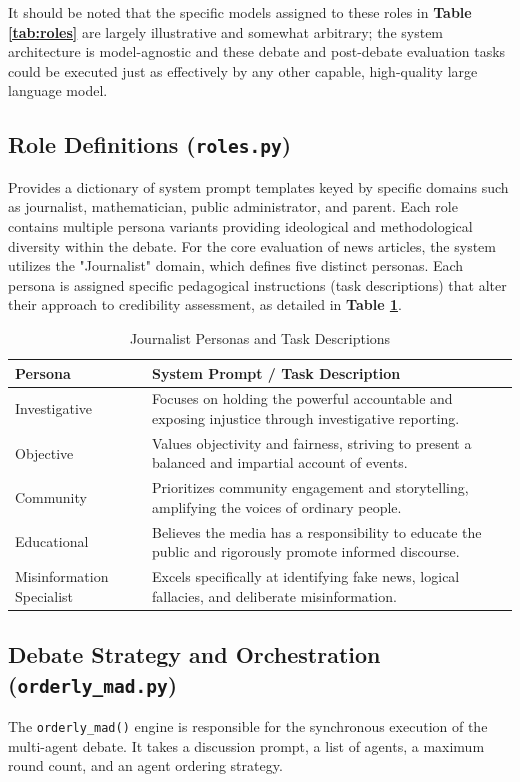 \documentclass[sigconf,nonacm]{acmart}
\begin{document}
It should be noted that the specific models assigned to these roles in \textbf{Table \ref{tab:roles}} are largely illustrative and somewhat arbitrary; the system architecture is model-agnostic and these debate and post-debate evaluation tasks could be executed just as effectively by any other capable, high-quality large language model.

\subsection{Role Definitions (\texttt{roles.py})}\label{sec:roles}
Provides a dictionary of system prompt templates keyed by specific domains such as journalist, mathematician, public administrator, and parent. Each role contains multiple persona variants providing ideological and methodological diversity within the debate. For the core evaluation of news articles, the system utilizes the "Journalist" domain, which defines five distinct personas. Each persona is assigned specific pedagogical instructions (task descriptions) that alter their approach to credibility assessment, as detailed in \textbf{Table \ref{tab:journalist_roles}}.

\begin{table}[h]
    \centering
    \caption{Journalist Personas and Task Descriptions}
    \label{tab:journalist_roles}
    \begin{tabular}{p{2cm} p{5.5cm}}
        \toprule
        \textbf{Persona} & \textbf{System Prompt / Task Description} \\
        \midrule
        Investigative & Focuses on holding the powerful accountable and exposing injustice through investigative reporting. \\
        Objective & Values objectivity and fairness, striving to present a balanced and impartial account of events. \\
        Community & Prioritizes community engagement and storytelling, amplifying the voices of ordinary people. \\
        Educational & Believes the media has a responsibility to educate the public and rigorously promote informed discourse. \\
        Misinformation Specialist & Excels specifically at identifying fake news, logical fallacies, and deliberate misinformation. \\
        \bottomrule
    \end{tabular}
\end{table}
\subsection{Debate Strategy and Orchestration (\texttt{orderly\_mad.py})}\label{sec:orderly_mad}
The \texttt{orderly\_mad()} engine is responsible for the synchronous execution of the multi-agent debate. It takes a discussion prompt, a list of agents, a maximum round count, and an agent ordering strategy. 
\end{document}
